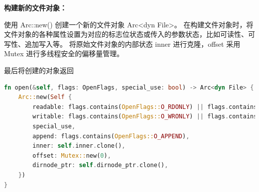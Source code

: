 \textbf{构建新的文件对象：}

使用 Arc::new() 创建一个新的文件对象 Arc<dyn File>。
在构建文件对象时，将文件对象的各种属性设置为对应的标志位状态或传入的参数状态，比如可读性、可写性、追加写入等。
将原始文件对象的内部状态 inner 进行克隆，offset 采用 Mutex 进行多线程安全的偏移量管理。

最后将创建的对象返回

\begin{lstlisting}[language={Rust}, 
    caption={OSInode的open方法}]
fn open(&self, flags: OpenFlags, special_use: bool) -> Arc<dyn File> {
    Arc::new(Self {
        readable: flags.contains(OpenFlags::O_RDONLY) || flags.contains(OpenFlags::O_RDWR),
        writable: flags.contains(OpenFlags::O_WRONLY) || flags.contains(OpenFlags::O_RDWR),
        special_use,
        append: flags.contains(OpenFlags::O_APPEND),
        inner: self.inner.clone(),
        offset: Mutex::new(0),
        dirnode_ptr: self.dirnode_ptr.clone(),
    })
}
\end{lstlisting}